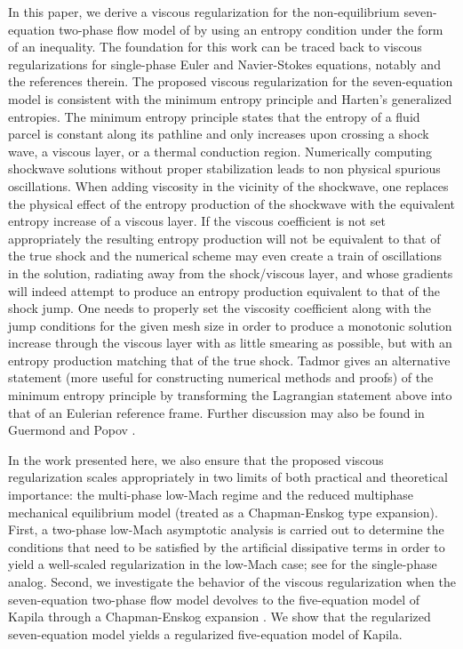 In this paper, we derive a viscous regularization for the non-equilibrium seven-equation two-phase flow model of \cite{SEM} by using an entropy condition under 
the form of an inequality. 
The foundation for this work can be traced back to viscous regularizations for single-phase Euler and Navier-Stokes equations, notably \cite{jlg_VR_SIAM_2004} and the references therein. 
The proposed viscous regularization for the seven-equation model is consistent with the minimum entropy principle and Harten's generalized entropies. 
The minimum entropy principle states that the entropy of a fluid parcel is constant along its pathline
and only increases upon crossing a shock wave, a viscous layer, or a thermal conduction region.  Numerically computing 
shockwave solutions without proper stabilization leads to non physical spurious oscillations. When adding viscosity in the vicinity 
of the shockwave, one replaces the physical effect of the entropy production of the shockwave with the equivalent entropy increase of a viscous layer.  
If the viscous coefficient is not set appropriately 
the resulting entropy production will not be equivalent to that of the true shock and the numerical scheme %
may even create a train of oscillations in the solution, radiating away from the shock/viscous layer, and whose gradients will indeed 
attempt to produce an entropy production equivalent to that of the shock jump. One needs to properly set the viscosity coefficient along with the 
jump conditions for the given mesh size in order to produce a monotonic solution increase through the viscous layer with as little smearing as possible, 
but with an entropy production matching that of the true shock.
Tadmor \cite{tadmor_minimum_entropy_principle} gives an alternative statement (more useful for constructing numerical methods and proofs) of the minimum 
entropy principle by transforming the Lagrangian statement above into that of an Eulerian reference frame. Further discussion may also be found in 
Guermond and Popov \cite{jlg_VR_SIAM_2004}.

In the work presented here, we also ensure that the proposed viscous regularization scales appropriately in two limits of both practical
and theoretical importance: the multi-phase low-Mach regime and the reduced multiphase mechanical equilibrium model 
(treated as a Chapman-Enskog type expansion).
First, a two-phase low-Mach asymptotic analysis is carried out to determine the conditions that need to be satisfied by the artificial dissipative 
terms in order to yield a well-scaled regularization in the low-Mach case; see \cite{Marco_paper_low_mach} for the single-phase analog. 
Second, we investigate the behavior of the viscous regularization when the seven-equation two-phase flow model devolves to the five-equation 
model of Kapila \cite{Kapila_2001} through a Chapman-Enskog expansion \cite{dellacherie,GuillardMurrone2003}. We show 
that the regularized seven-equation model yields a regularized five-equation model of Kapila.

